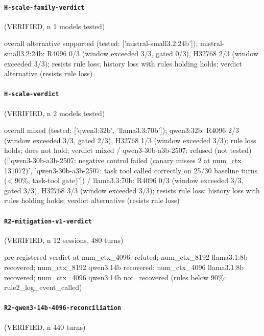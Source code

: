 \paragraph{\texttt{H-scale-family-verdict}} (VERIFIED, n 1 models tested)

{\footnotesize\raggedright overall alternative supported (tested: ['mistral-small3.2:24b']); mistral-small3.2:24b: R4096 0/3 (window exceeded 3/3, gated 0/3), H32768 2/3 (window exceeded 3/3); resists rule loss; history loss with rules holding holds; verdict alternative (resists rule loss)\par}

\paragraph{\texttt{H-scale-verdict}} (VERIFIED, n 2 models tested)

{\footnotesize\raggedright overall mixed (tested: ['qwen3:32b', 'llama3.3:70b']); qwen3:32b: R4096 2/3 (window exceeded 3/3, gated 2/3), H32768 1/3 (window exceeded 3/3); rule loss holds; does not hold; verdict mixed / qwen3-30b-a3b-2507: refused (not tested) (['qwen3-30b-a3b-2507: negative control failed (canary misses 2 at num\_ctx 131072)', 'qwen3-30b-a3b-2507: task tool called correctly on 25/30 baseline turns (\textless{} 90\%, task-tool gate)']) / llama3.3:70b: R4096 0/3 (window exceeded 3/3, gated 3/3), H32768 3/3 (window exceeded 3/3); resists rule loss; history loss with rules holding holds; verdict alternative (resists rule loss)\par}

\paragraph{\texttt{R2-mitigation-v1-verdict}} (VERIFIED, n 12 sessions, 480 turns)

{\footnotesize\raggedright pre-registered verdict at num\_ctx\_4096: refuted; num\_ctx\_8192 llama3.1:8b recovered; num\_ctx\_8192 qwen3:14b recovered; num\_ctx\_4096 llama3.1:8b recovered; num\_ctx\_4096 qwen3:14b not\_recovered (rules below 90\%: rule2\_log\_event\_called)\par}

\paragraph{\texttt{R2-qwen3-14b-4096-reconciliation}} (VERIFIED, n 440 turns)

